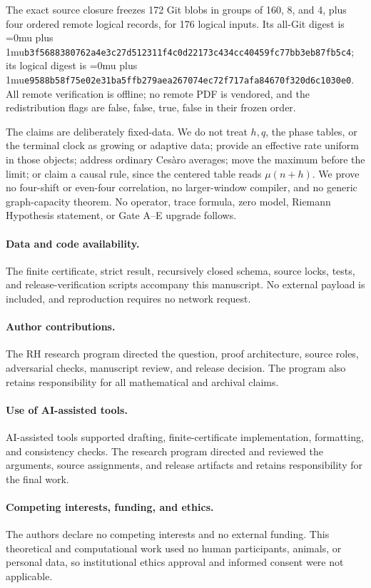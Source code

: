 \documentclass[11pt]{article}
\theoremstyle{definition}
\theoremstyle{remark}
\newcommand{\mob}{\mu}
\newcommand{\artifacthash}[1]{\begingroup\Urlmuskip=0mu plus 1mu\relax\nolinkurl{#1}\endgroup}
\begin{document}
The exact source closure freezes 172 Git blobs in groups of 160, 8, and 4,
plus four ordered remote logical records, for 176 logical inputs.  Its
all-Git digest is
\artifacthash{b3f5688380762a4e3c27d512311f4c0d22173c434cc40459fc77bb3eb87fb5c4};
its logical digest is
\artifacthash{e9588b58f75e02e31ba5ffb279aea267074ec72f717afa84670f320d6c1030e0}.
All remote verification is offline; no remote PDF is vendored, and the
redistribution flags are false, false, true, false in their frozen order.

The claims are deliberately fixed-data.  We do not treat \(h,q\), the
phase tables, or the terminal clock as growing or adaptive data; provide an
effective rate uniform in those objects; address ordinary Ces\`aro averages;
move the maximum before the limit; or claim a causal rule, since the centered
table reads \(\mob(n+h)\).  We prove no four-shift or even-four correlation,
no larger-window compiler, and no generic graph-capacity theorem.  No
operator, trace formula, zero model, Riemann Hypothesis statement, or Gate
A--E upgrade follows.

\paragraph{Data and code availability.}
The finite certificate, strict result, recursively closed schema, source
locks, tests, and release-verification scripts accompany this manuscript.
No external payload is included, and reproduction requires no network
request.

\paragraph{Author contributions.}
The RH research program directed the question, proof architecture, source
roles, adversarial checks, manuscript review, and release decision.  The
program also retains responsibility for all mathematical and archival claims.

\paragraph{Use of AI-assisted tools.}
AI-assisted tools supported drafting, finite-certificate implementation,
formatting, and consistency checks.  The research program directed and
reviewed the arguments, source assignments, and release artifacts and retains
responsibility for the final work.

\paragraph{Competing interests, funding, and ethics.}
The authors declare no competing interests and no external funding.  This
theoretical and computational work used no human participants, animals, or
personal data, so institutional ethics approval and informed consent were not
applicable.

\begingroup
\raggedright


\endgroup
\end{document}
